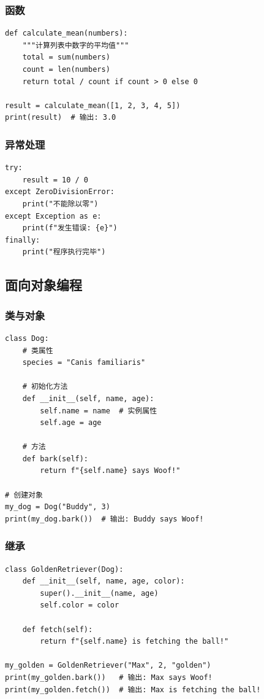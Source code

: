 \documentclass[12pt,UTF8]{ctexbook}
\begin{document}
\subsubsection{函数}

\begin{lstlisting}
def calculate_mean(numbers):
    """计算列表中数字的平均值"""
    total = sum(numbers)
    count = len(numbers)
    return total / count if count > 0 else 0

result = calculate_mean([1, 2, 3, 4, 5])
print(result)  # 输出: 3.0
\end{lstlisting}

\subsubsection{异常处理}

\begin{lstlisting}
try:
    result = 10 / 0
except ZeroDivisionError:
    print("不能除以零")
except Exception as e:
    print(f"发生错误: {e}")
finally:
    print("程序执行完毕")
\end{lstlisting}

\subsection{面向对象编程}

\subsubsection{类与对象}

\begin{lstlisting}
class Dog:
    # 类属性
    species = "Canis familiaris"
    
    # 初始化方法
    def __init__(self, name, age):
        self.name = name  # 实例属性
        self.age = age
    
    # 方法
    def bark(self):
        return f"{self.name} says Woof!"

# 创建对象
my_dog = Dog("Buddy", 3)
print(my_dog.bark())  # 输出: Buddy says Woof!
\end{lstlisting}

\subsubsection{继承}

\begin{lstlisting}
class GoldenRetriever(Dog):
    def __init__(self, name, age, color):
        super().__init__(name, age)
        self.color = color
    
    def fetch(self):
        return f"{self.name} is fetching the ball!"

my_golden = GoldenRetriever("Max", 2, "golden")
print(my_golden.bark())   # 输出: Max says Woof!
print(my_golden.fetch())  # 输出: Max is fetching the ball!
\end{lstlisting}
\end{document}
